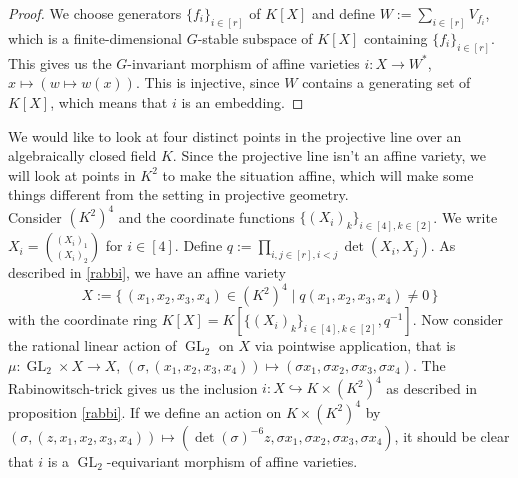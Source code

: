 
\begin{proof}
  We choose generators $\{f_i\}_{i \in [r]}$ of $K[X]$ and define $W := \sum_{i \in [r]} V_{f_i}$, which is a finite-dimensional $G$-stable subspace of $K[X]$ containing $\{f_i\}_{i \in [r]}$.
  This gives us the $G$-invariant morphism of affine varieties $i \colon X \longrightarrow W^\ast$, $x \mapsto (w \mapsto w(x))$.
  This is injective, since $W$ contains a generating set of $K[X]$, which means that $i$ is an embedding.
\end{proof}

\begin{dexample}\label{domcr}
  We would like to look at four distinct points in the projective line over an algebraically closed field $K$.
  Since the projective line isn't an affine variety, we will look at points in $K^2$ to make the situation affine, which will make some things different from the setting in projective geometry.\\
  Consider $(K^2)^4$ and the coordinate functions $\{(X_i)_k\}_{i \in [4], k \in [2]}$.
  We write $X_i = \binom{(X_i)_1}{(X_i)_2}$ for $i \in [4]$.
  Define $q := \prod_{i,j \in [r], i<j} \operatorname{det}(X_i,X_j)$.
  As described in \ref{rabbi}, we have an affine variety
  \begin{equation}
    X := \{\, (x_1,x_2,x_3,x_4) \in (K^2)^4 \mid q(x_1,x_2,x_3,x_4) \neq 0 \,\}
  \end{equation}
  with the coordinate ring $K[X] = K[\{(X_i)_k\}_{i \in [4], k \in [2]},q^{-1}]$.
  Now consider the rational linear action of $\operatorname{GL}_2$ on $X$ via pointwise application, that is $\mu \colon \operatorname{GL}_2 \times X \longrightarrow X$, $(\sigma,(x_1,x_2,x_3,x_4)) \mapsto (\sigma x_1,\sigma x_2,\sigma x_3,\sigma x_4)$.
  The Rabinowitsch-trick gives us the inclusion $i \colon X \hookrightarrow K \times (K^2)^4$ as described in proposition \ref{rabbi}.
  If we define an action on $K \times (K^2)^4$ by $(\sigma,(z,x_1,x_2,x_3,x_4)) \mapsto (\operatorname{det}(\sigma)^{-6}z,\sigma x_1,\sigma x_2,\sigma x_3,\sigma x_4)$, it should be clear that $i$ is a $\operatorname{GL}_2$-equivariant morphism of affine varieties.
\end{dexample}

